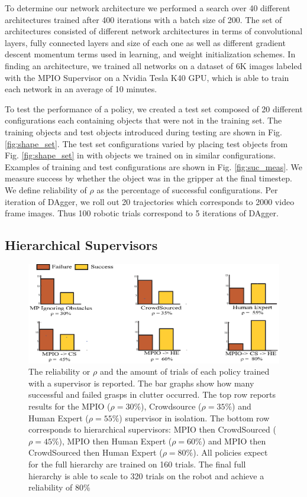 \documentclass[10pt, conference]{ieeeconf}      %
\begin{document}
To determine our network architecture we performed a search over 40 different architectures trained after 400 iterations
with a batch size of 200. The set of architectures consisted of different network architectures in terms of
convolutional layers, fully connected layers and size of each one as well as different gradient descent momentum
terms used in learning, and weight initialization schemes. In finding an architecture, we trained all networks on a dataset of 6K images labeled with the MPIO Supervisor on a Nvidia Tesla K40 GPU, which is able to train each network in an average of 10 minutes.  

To test the performance of a policy, we created a test set composed of 20 different configurations each containing
objects that were not in the training set.  The training objects and test
objects introduced during testing are shown in Fig. \ref{fig:shape_set}. The test set configurations varied by placing
test objects from Fig. \ref{fig:shape_set} in with objects we trained on in similar configurations. Examples of training and test configurations are shown in Fig. \ref{fig:suc_meas}.  We measure success by whether the object was in the gripper at the final timestep. We define reliability of $\rho$ as the percentage of successful configurations.
Per iteration of DAgger, we roll out 20 trajectories which corresponds to 2000 video frame images. Thus 100 robotic trials correspond to 5 iterations of DAgger.

\subsection{Hierarchical Supervisors}

\begin{figure}[t]
\centering
\includegraphics{f_figs/results.eps}

\caption{ \footnotesize The reliability or $\rho$ and the amount of trials of each policy trained with a supervisor is reported. The bar graphs
show how many successful and failed grasps in clutter occurred. The top row 
reports results for the MPIO ($\rho = 30\%$), Crowdsource ($\rho = 35\%$) and  Human Expert ($\rho = 55\%$) supervisor in isolation.
The bottom row corresponds to hierarchical supervisors: MPIO then CrowdSourced ($\rho = 45\%$), MPIO then Human Expert ($\rho = 60\%$) and MPIO then CrowdSourced then Human Expert ($\rho = 80\%$). All policies expect for the full hierarchy are trained on 160 trials. The final full hierarchy is able to scale to 320 trials on the robot and achieve a reliability of $80\%$}

\label{fig:perf_results}
\end{figure}
\end{document}

